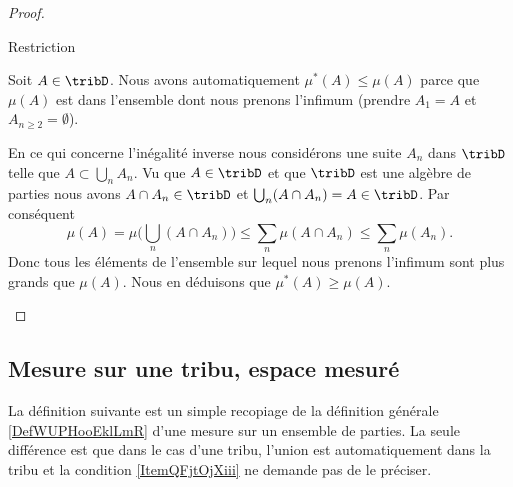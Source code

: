 \begin{proof}
\begin{subproof}
    \item[Restriction]

        Soit \( A\in\tribD\). Nous avons automatiquement \( \mu^*(A)\leq \mu(A)\) parce que \( \mu(A)\) est dans l'ensemble dont nous prenons l'infimum (prendre \( A_1=A\) et \( A_{n\geq 2}=\emptyset\)).

        En ce qui concerne l'inégalité inverse nous considérons une suite \( A_n\) dans \( \tribD\) telle que \( A\subset\bigcup_nA_n\). Vu que \( A\in\tribD\) et que \( \tribD\) est une algèbre de parties nous avons \( A\cap A_n\in \tribD\) et \( \bigcup_n(A\cap A_n)=A\in\tribD\). Par conséquent
        \begin{equation}
            \mu(A)=\mu\big( \bigcup_n(A\cap A_n) \big)\leq \sum_n\mu(A\cap A_n)\leq \sum_n\mu(A_n).
        \end{equation}
        Donc tous les éléments de l'ensemble sur lequel nous prenons l'infimum sont plus grands que \( \mu(A)\). Nous en déduisons que \( \mu^*(A)\geq \mu(A)\).
    \end{subproof}
\end{proof}

\subsection{Mesure sur une tribu, espace mesuré}

La définition suivante est un simple recopiage de la définition générale \ref{DefWUPHooEklLmR} d'une mesure sur un ensemble de parties. La seule différence est que dans le cas d'une tribu, l'union est automatiquement dans la tribu et la condition \ref{ItemQFjtOjXiii} ne demande pas de le préciser.

